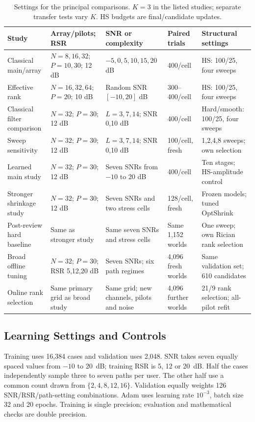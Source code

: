 \documentclass[10pt,journal,letterpaper]{IEEEtran}
\begin{document}
\begin{table}[!t]
\caption{Settings for the principal comparisons. $K=3$ in the listed studies; separate transfer tests vary $K$. HS budgets are final/candidate updates.}
\label{tab:settings}\centering\footnotesize
\begin{tabular}{@{}p{1.13in}p{1.33in}p{1.27in}p{0.90in}p{1.16in}@{}}\toprule
Study & Array/pilots; RSR & SNR or complexity & Paired trials & Structural settings\\\midrule
Classical main/array & $N=8,16,32$; $P=10,30$; 12 dB & $-5,0,5,10,15,20$ dB & 400/cell & HS: 100/25, four sweeps\\
Effective rank & $N=16,32,64$; $P=20$; 10 dB & Random SNR $[-10,20]$ dB & 300--400/cell & HS: 100/25, four sweeps\\
Classical filter comparison & $N=32$; $P=30$; 12 dB & $L=3,7,14$; SNR 0,10 dB & 400/cell & Hard/smooth: 100/25, four sweeps\\
Sweep sensitivity & $N=32$; $P=30$; 12 dB & $L=3,7,14$; SNR 0,10 dB & 100/cell, fresh & 1,2,4,8 sweeps; own selection\\
Learned main study & $N=32$; $P=30$; 12 dB & Seven SNRs from $-10$ to 20 dB & 400/cell & Ten stages; HS-amplitude control\\
Stronger shrinkage study & $N=32$; $P=30$; 12 dB & Seven SNRs and two stress cells & 128/cell, fresh & Frozen models; tuned OptShrink\\
Post-review hard baseline & Same as stronger study & Same seven SNRs and stress cells & Same 1,152 worlds & One sweep; own Rician rank selection\\
Broad offline tuning & $N=32$; $P=30$; RSR 5,12,20 dB & Seven SNRs; six path regimes & 4,096 fresh worlds & Same validation set; 610 candidates\\
Online rank selection & Same primary grid as broad study & Same grid; new channels, pilots and noise & 4,096 further worlds & 21/9 rank selection; all-pilot refit\\\bottomrule
\end{tabular}
\end{table}

\subsection{Learning Settings and Controls}
Training uses 16,384 cases and validation uses 2,048. SNR takes seven equally spaced values from $-10$ to 20~dB; training RSR is 5, 12 or 20~dB. Half the cases independently sample three to seven paths per user. The other half use a common count drawn from $\{2,4,8,12,16\}$. Validation equally weights 126 SNR/RSR/path-setting combinations. Adam uses learning rate $10^{-3}$, batch size 32 and 20 epochs. Training is single precision; evaluation and mathematical checks are double precision.
\end{document}
